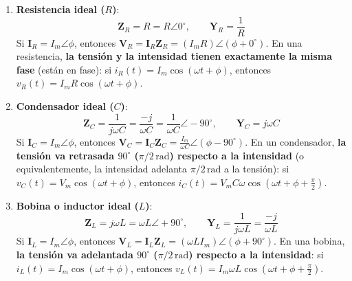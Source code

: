 \begin{enumerate}
    \item \textbf{Resistencia ideal ($R$)}:
    \begin{equation}
        \mathbf{Z}_R = R = R\angle 0^\circ, \qquad \mathbf{Y}_R = \frac{1}{R}
    \end{equation}
    Si $\mathbf{I}_R = I_m\angle\phi$, entonces $\mathbf{V}_R = \mathbf{I}_R \mathbf{Z}_R = (I_m R)\angle(\phi + 0^\circ)$. En una resistencia, \textbf{la tensión y la intensidad tienen exactamente la misma fase} (están en fase): si $i_R(t) = I_m\cos(\omega t + \phi)$, entonces $v_R(t) = I_m R\cos(\omega t + \phi)$.

    \item \textbf{Condensador ideal ($C$)}:
    \begin{equation}
        \mathbf{Z}_C = \frac{1}{j\omega C} = \frac{-j}{\omega C} = \frac{1}{\omega C}\angle -90^\circ, \qquad \mathbf{Y}_C = j\omega C
    \end{equation}
    Si $\mathbf{I}_C = I_m\angle\phi$, entonces $\mathbf{V}_C = \mathbf{I}_C \mathbf{Z}_C = \frac{I_m}{\omega C}\angle(\phi - 90^\circ)$. En un condensador, \textbf{la tensión va retrasada $90^\circ$ ($\pi/2\,\si{\radian}$) respecto a la intensidad} (o equivalentemente, la intensidad adelanta $\pi/2\,\si{\radian}$ a la tensión): si $v_C(t) = V_m\cos(\omega t + \phi)$, entonces $i_C(t) = V_m C\omega\cos\left(\omega t + \phi + \frac{\pi}{2}\right)$.

    \item \textbf{Bobina o inductor ideal ($L$)}:
    \begin{equation}
        \mathbf{Z}_L = j\omega L = \omega L\angle +90^\circ, \qquad \mathbf{Y}_L = \frac{1}{j\omega L} = \frac{-j}{\omega L}
    \end{equation}
    Si $\mathbf{I}_L = I_m\angle\phi$, entonces $\mathbf{V}_L = \mathbf{I}_L \mathbf{Z}_L = (\omega L I_m)\angle(\phi + 90^\circ)$. En una bobina, \textbf{la tensión va adelantada $90^\circ$ ($\pi/2\,\si{\radian}$) respecto a la intensidad}: si $i_L(t) = I_m\cos(\omega t + \phi)$, entonces $v_L(t) = I_m\omega L\cos\left(\omega t + \phi + \frac{\pi}{2}\right)$.
\end{enumerate}

